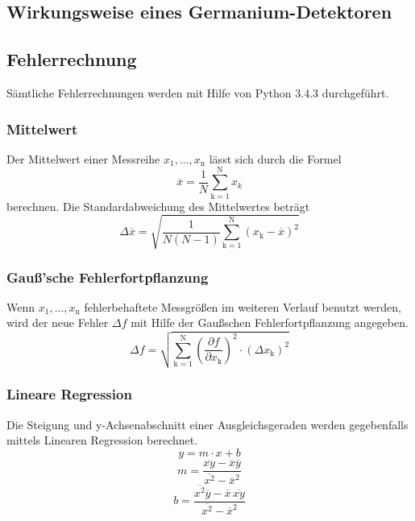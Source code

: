 \subsection{Wirkungsweise eines Germanium-Detektoren}




\subsection{Fehlerrechnung}
Sämtliche Fehlerrechnungen werden mit Hilfe von Python 3.4.3 durchgeführt.
\subsubsection{Mittelwert}
Der Mittelwert einer Messreihe $x_\text{1}, ... ,x_\text{n}$ lässt sich durch die Formel
\begin{equation}
	\overline{x} = \frac{1}{N} \sum_{\text{k}=1}^\text{N} x_k
	\label{eqn:ave}
\end{equation}
berechnen. Die Standardabweichung des Mittelwertes beträgt
\begin{equation}
	\Delta \overline{x} = \sqrt{ \frac{1}{N(N-1)} \sum_{\text{k}=1}^\text{N} (x_\text{k} - \overline{x})^2}
	\label{eqn:std}
\end{equation}

\subsubsection{Gauß'sche Fehlerfortpflanzung}
Wenn $x_\text{1}, ..., x_\text{n}$ fehlerbehaftete Messgrößen im weiteren Verlauf benutzt werden, wird der neue Fehler $\Delta f$ mit Hilfe der Gaußschen Fehlerfortpflanzung angegeben.
\begin{equation}
	\Delta f = \sqrt{\sum_{\text{k}=1}^\text{N} \left( \frac{ \partial f}{\partial x_\text{k}} \right) ^2 \cdot (\Delta x_\text{k})^2}
	\label{eqn:var}
\end{equation}

\subsubsection{Lineare Regression}
Die Steigung und y-Achsenabschnitt einer Ausgleichsgeraden werden gegebenfalls mittels Linearen Regression berechnet.
\begin{equation}
	y = m \cdot x + b
	\label{eqn:reg}
\end{equation}
\begin{equation}
	m = \frac{ \overline{xy} - \overline{x} \overline{y} } {\overline{x^2} - \overline{x}^2}
	\label{eqn:reg_m}
\end{equation}
\begin{equation}
	b = \frac{ \overline{x^2}\overline{y} - \overline{x} \, \overline{xy}} { \overline{x^2} - \overline{x}^2}
	\label{eqn:reg_b}
\end{equation}
